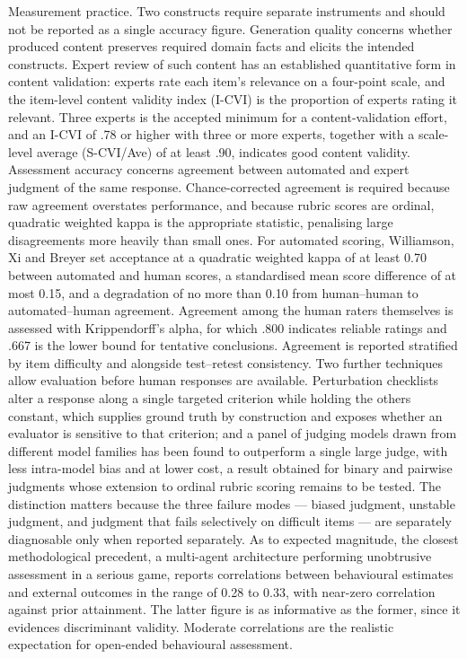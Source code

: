 Measurement practice. Two constructs require separate instruments and should not be reported as a single accuracy figure. Generation quality concerns whether produced content preserves required domain facts and elicits the intended constructs. Expert review of such content has an established quantitative form in content validation: experts rate each item's relevance on a four-point scale, and the item-level content validity index (I-CVI) is the proportion of experts rating it relevant. Three experts is the accepted minimum for a content-validation effort\cite{r69,r70}, and an I-CVI of .78 or higher with three or more experts, together with a scale-level average (S-CVI/Ave) of at least .90, indicates good content validity\cite{r70}. Assessment accuracy concerns agreement between automated and expert judgment of the same response. Chance-corrected agreement is required because raw agreement overstates performance, and because rubric scores are ordinal, quadratic weighted kappa is the appropriate statistic, penalising large disagreements more heavily than small ones. For automated scoring, Williamson, Xi and Breyer\cite{r71} set acceptance at a quadratic weighted kappa of at least 0.70 between automated and human scores, a standardised mean score difference of at most 0.15, and a degradation of no more than 0.10 from human--human to automated--human agreement. Agreement among the human raters themselves is assessed with Krippendorff's alpha, for which .800 indicates reliable ratings and .667 is the lower bound for tentative conclusions\cite{r72}. Agreement is reported stratified by item difficulty and alongside test--retest consistency. Two further techniques allow evaluation before human responses are available. Perturbation checklists alter a response along a single targeted criterion while holding the others constant, which supplies ground truth by construction and exposes whether an evaluator is sensitive to that criterion\cite{r73}; and a panel of judging models drawn from different model families has been found to outperform a single large judge, with less intra-model bias and at lower cost\cite{r74}, a result obtained for binary and pairwise judgments whose extension to ordinal rubric scoring remains to be tested. The distinction matters because the three failure modes --- biased judgment, unstable judgment, and judgment that fails selectively on difficult items --- are separately diagnosable only when reported separately. As to expected magnitude, the closest methodological precedent, a multi-agent architecture performing unobtrusive assessment in a serious game, reports correlations between behavioural estimates and external outcomes in the range of 0.28 to 0.33, with near-zero correlation against prior attainment\cite{r75}. The latter figure is as informative as the former, since it evidences discriminant validity. Moderate correlations are the realistic expectation for open-ended behavioural assessment.

